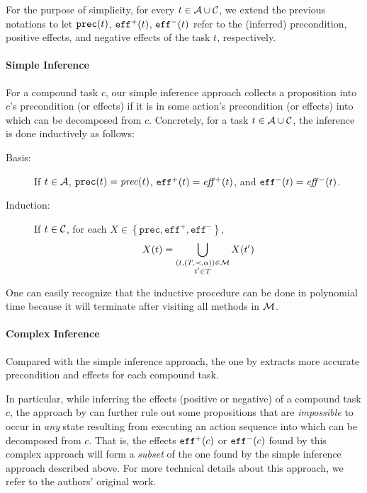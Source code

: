 For the purpose of simplicity, for every $t \in \mathcal{A}{} \cup \mathcal{C}{}$, we extend the previous notations to let $\mathtt{prec}(t)$, $\mathtt{eff}^{+}(t)$, $\mathtt{eff}^{-}(t)$ refer to the (inferred) precondition, positive effects, and negative effects of the task $t$, respectively.

\paragraph{Simple Inference} For a compound task $c$, our simple inference approach collects a proposition into $c$'s precondition (or effects) if it is in some action's precondition (or effects) into which can be decomposed from $c$. 
Concretely, for a task $t \in \mathcal{A}{} \cup \mathcal{C}{}$, the inference is done inductively as follows:
\begin{description}
    \item[Basis:] If $t \in \mathcal{A}{}$, $\mathtt{prec}(t) = \mathit{prec}(t)$, $\mathtt{eff}^{+}(t) = \mathit{eff}{}^{+}(t)$, and $\mathtt{eff}^{-}(t) = \mathit{eff}{}^{-}(t)$.
    \item[Induction:] If $t \in \mathcal{C}{}$, for each $X \in \left\{\mathtt{prec}, \mathtt{eff}^{+}, \mathtt{eff}^{-}\right\}$,
    \begin{displaymath}
        X(t) = \bigcup_{\substack{(t, (T, \mathord{\prec}{}, \alpha)) \in \mathcal{M}{}\\t' \in T}}X(t')
    \end{displaymath}
\end{description}

One can easily recognize that the inductive procedure can be done in polynomial time because it will terminate after visiting all methods in $\mathcal{M}{}$.  

\paragraph{Complex Inference} Compared with the simple inference approach, the one by  extracts more accurate precondition and effects for each compound task.

In particular, while inferring the effects (positive or negative) of a compound task $c$, the approach by  can further rule out some propositions that are \emph{impossible} to occur in \emph{any} state resulting from executing an action sequence into which can be decomposed from $c$. That is, the effects $\mathtt{eff}^{+}(c)$ or $\mathtt{eff}^{-}(c)$ found by this complex approach will form a \emph{subset} of the one found by the simple inference approach described above. For more technical details about this approach, we refer to the authors' original work.

